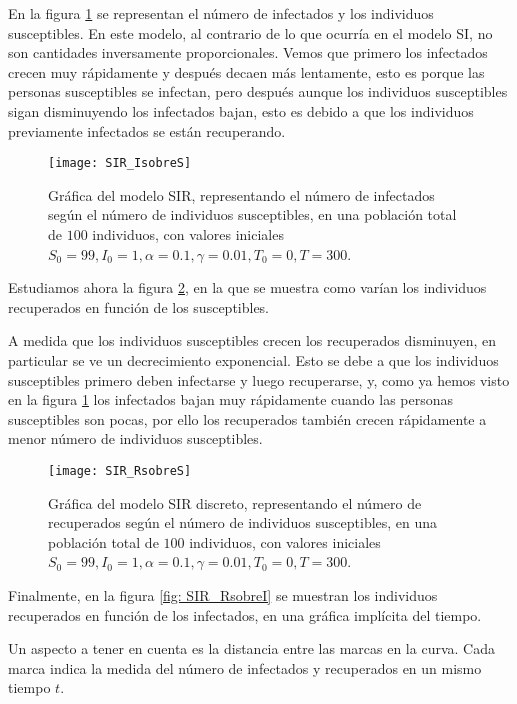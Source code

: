 En la figura \ref{fig: SIR_IsobreS} se representan el número de infectados y los individuos susceptibles. En este modelo, al contrario de lo que ocurría en el modelo SI, no son cantidades inversamente proporcionales. Vemos que primero los infectados crecen muy rápidamente y después decaen más lentamente, esto es porque las personas susceptibles se infectan, pero después aunque los individuos susceptibles sigan disminuyendo los infectados bajan, esto es debido a que los individuos previamente infectados se están recuperando.

\begin{figure}
\begin{center}
\caption{Gráfica del modelo SIR, representando el número de infectados según el número de individuos susceptibles, en una población total de $100$ individuos, con valores iniciales $S_0=99, I_0 = 1, \alpha = 0.1, \gamma=0.01, T_0 = 0, T = 300$.}
\label{fig: SIR_IsobreS}
\texttt{[image: SIR\_IsobreS]}
\end{center}
\end{figure}

Estudiamos ahora la figura \ref{fig: SIR_RsobreS}, en la que se muestra como varían los individuos recuperados en función de los susceptibles.

A medida que los individuos susceptibles crecen los recuperados disminuyen, en particular se ve un decrecimiento exponencial. Esto se debe a que los individuos susceptibles primero deben infectarse y luego recuperarse, y, como ya hemos visto en la figura \ref{fig: SIR_IsobreS} los infectados bajan muy rápidamente cuando las personas susceptibles son pocas, por ello los recuperados también crecen rápidamente a menor número de individuos susceptibles.

\begin{figure}
\begin{center}
\caption{Gráfica del modelo SIR discreto, representando el número de recuperados según el número de individuos susceptibles, en una población total de $100$ individuos, con valores iniciales $S_0=99, I_0 = 1, \alpha = 0.1, \gamma=0.01, T_0 = 0, T = 300$.}
\label{fig: SIR_RsobreS}
\texttt{[image: SIR\_RsobreS]}
\end{center}
\end{figure}

Finalmente, en la figura \ref{fig: SIR_RsobreI} se muestran los individuos recuperados en función de los infectados, en una gráfica implícita del tiempo.

Un aspecto a tener en cuenta es la distancia entre las marcas en la curva. Cada marca indica la medida del número de infectados y recuperados en un mismo tiempo $t$.

